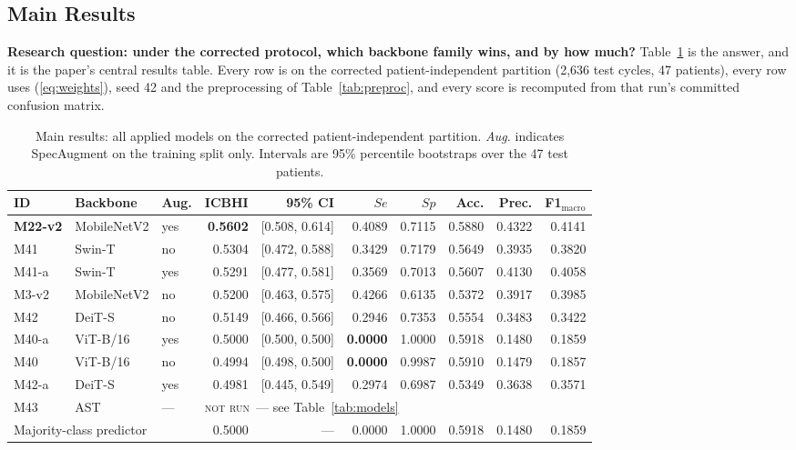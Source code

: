 \documentclass[journal,onecolumn]{IEEEtran}
\newcommand{\best}[1]{\textbf{#1}}
\newcommand{\notrun}{\textsc{not run}}
\begin{document}
\subsection{Main Results}
\label{subsec:main}

\textbf{Research question: under the corrected protocol, which backbone family
wins, and by how much?} Table~\ref{tab:main} is the answer, and it is the paper's
central results table. Every row is on the corrected patient-independent partition
(2{,}636 test cycles, 47 patients), every row uses (\ref{eq:weights}), seed 42 and
the preprocessing of Table~\ref{tab:preproc}, and every score is recomputed from
that run's committed confusion matrix.

\begin{table}[!t]
\centering
\caption{Main results: all applied models on the corrected patient-independent
partition. \emph{Aug.} indicates SpecAugment on the training split only.
Intervals are 95\% percentile bootstraps over the 47 test patients.}
\label{tab:main}
\small
\begin{tabular}{lllrrrrrrr}
\toprule
ID & Backbone & Aug. & \best{ICBHI} & 95\% CI & $Se$ & $Sp$ & Acc. & Prec. & F1$_{\text{macro}}$ \\
\midrule
\best{M22-v2} & MobileNetV2 & yes & \best{0.5602} & [0.508, 0.614] & 0.4089 & 0.7115 & 0.5880 & 0.4322 & 0.4141 \\
M41     & Swin-T      & no  & 0.5304 & [0.472, 0.588] & 0.3429 & 0.7179 & 0.5649 & 0.3935 & 0.3820 \\
M41-a   & Swin-T      & yes & 0.5291 & [0.477, 0.581] & 0.3569 & 0.7013 & 0.5607 & 0.4130 & 0.4058 \\
M3-v2   & MobileNetV2 & no  & 0.5200 & [0.463, 0.575] & 0.4266 & 0.6135 & 0.5372 & 0.3917 & 0.3985 \\
M42     & DeiT-S      & no  & 0.5149 & [0.466, 0.566] & 0.2946 & 0.7353 & 0.5554 & 0.3483 & 0.3422 \\
M40-a   & ViT-B/16    & yes & 0.5000 & [0.500, 0.500] & \best{0.0000} & 1.0000 & 0.5918 & 0.1480 & 0.1859 \\
M40     & ViT-B/16    & no  & 0.4994 & [0.498, 0.500] & \best{0.0000} & 0.9987 & 0.5910 & 0.1479 & 0.1857 \\
M42-a   & DeiT-S      & yes & 0.4981 & [0.445, 0.549] & 0.2974 & 0.6987 & 0.5349 & 0.3638 & 0.3571 \\
M43     & AST         & --- & \multicolumn{7}{l}{\notrun\ --- see Table~\ref{tab:models}} \\
\midrule
\multicolumn{3}{l}{Majority-class predictor} & 0.5000 & --- & 0.0000 & 1.0000 & 0.5918 & 0.1480 & 0.1859 \\
\bottomrule
\end{tabular}
\end{table}
\end{document}
